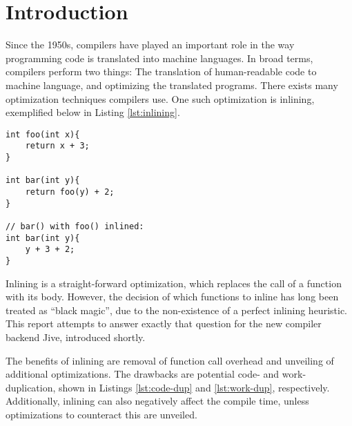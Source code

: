 
\section{Introduction}
\label{introduction}

Since the 1950s, compilers have played an important role in the way programming
code is translated into machine languages. In broad terms, compilers perform two
things: The translation of human-readable code to machine language, and
optimizing the translated programs. There exists many optimization techniques
compilers use. One such optimization is inlining, exemplified below in Listing
\ref{lst:inlining}.

\begin{lstlisting}[caption={Function inlining}, label={lst:inlining},
style=customcpp]
int foo(int x){
	return x + 3;
}

int bar(int y){
	return foo(y) + 2;
}

// bar() with foo() inlined:
int bar(int y){
	y + 3 + 2;
}
\end{lstlisting}

Inlining is a straight-forward optimization, which replaces the call of a
function with its body. However, the decision of which functions to inline has
long been treated as ``black magic'', due to the non-existence of a perfect
inlining heuristic. This report attempts to answer exactly that question for the
new compiler backend Jive, introduced shortly.

The benefits of inlining are removal of function call overhead and unveiling of
additional optimizations. The drawbacks are potential code- and work-
duplication, shown in Listings \ref{lst:code-dup} and \ref{lst:work-dup},
respectively. Additionally, inlining can also negatively affect the compile
time, unless optimizations to counteract this are unveiled.

